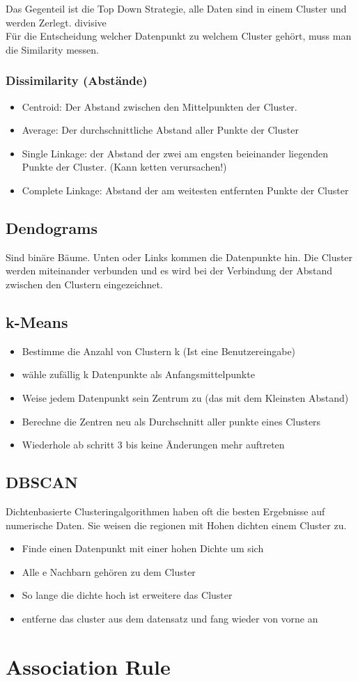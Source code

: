 \documentclass[a4paper]{scrartcl}
\begin{document}
Das Gegenteil ist die Top Down Strategie, alle Daten sind in einem Cluster und werden Zerlegt. divisive\\

Für die Entscheidung welcher Datenpunkt zu welchem Cluster gehört, muss man die Similarity messen.

\subsubsection{Dissimilarity (Abstände)}
\begin{itemize}
\item Centroid: Der Abstand zwischen den Mittelpunkten der Cluster.
\item Average: Der durchschnittliche Abstand aller Punkte der Cluster
\item Single Linkage: der Abstand der zwei am engsten beieinander liegenden Punkte der Cluster. (Kann ketten verursachen!)
\item Complete Linkage: Abstand der am weitesten entfernten Punkte der Cluster
\end{itemize}
\subsection{Dendograms}
Sind binäre Bäume. Unten oder Links kommen die Datenpunkte hin. Die Cluster werden miteinander verbunden und es wird bei der Verbindung der Abstand zwischen den Clustern eingezeichnet. 
\subsection{k-Means}
\begin{itemize}
\item Bestimme die Anzahl von Clustern k (Ist eine Benutzereingabe)
\item wähle zufällig k Datenpunkte als Anfangsmittelpunkte
\item Weise jedem Datenpunkt sein Zentrum zu (das mit dem Kleinsten Abstand)
\item Berechne die Zentren neu als Durchschnitt aller punkte eines Clusters
\item Wiederhole ab schritt 3 bis keine Änderungen mehr auftreten
\end{itemize} 
\subsection{DBSCAN}
Dichtenbasierte Clusteringalgorithmen haben oft die besten Ergebnisse auf numerische Daten. Sie weisen die regionen mit Hohen dichten einem Cluster zu.
\begin{itemize}
\item Finde einen Datenpunkt mit einer hohen Dichte um sich
\item Alle e Nachbarn gehören zu dem Cluster
\item So lange die dichte hoch ist erweitere das Cluster
\item entferne das cluster aus dem datensatz und fang wieder von vorne an
\end{itemize}

\section{Association Rule}
\end{document}
